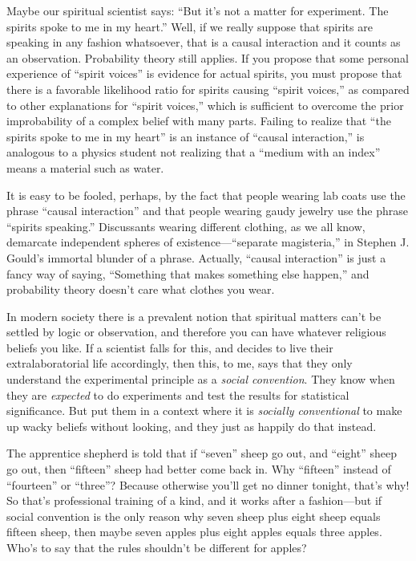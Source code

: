{
 Maybe our spiritual scientist says: ``But
it's not a matter for experiment. The spirits spoke to
me in my heart.'' Well, if we really suppose that
spirits are speaking in any fashion whatsoever, that is a causal
interaction and it counts as an observation. Probability theory still
applies. If you propose that some personal experience of
``spirit voices'' is evidence for
actual spirits, you must propose that there is a favorable likelihood
ratio for spirits causing ``spirit
voices,'' as compared to other explanations for
``spirit voices,'' which is
sufficient to overcome the prior improbability of a complex belief with
many parts. Failing to realize that ``the spirits
spoke to me in my heart'' is an instance of
``causal interaction,'' is analogous
to a physics student not realizing that a ``medium
with an index'' means a material such as water.}

{
 It is easy to be fooled, perhaps, by the fact that people wearing
lab coats use the phrase ``causal
interaction'' and that people wearing gaudy jewelry
use the phrase ``spirits speaking.''
Discussants wearing different clothing, as we all know, demarcate
independent spheres of existence---``separate
magisteria,'' in Stephen J. Gould's
immortal blunder of a phrase. Actually, ``causal
interaction'' is just a fancy way of saying,
``Something that makes something else
happen,'' and probability theory
doesn't care what clothes you wear.}

{
 In modern society there is a prevalent notion that spiritual
matters can't be settled by logic or observation, and
therefore you can have whatever religious beliefs you like. If a
scientist falls for this, and decides to live their extralaboratorial
life accordingly, then this, to me, says that they only understand the
experimental principle as a \textit{social convention}. They know when
they are \textit{expected} to do experiments and test the results for
statistical significance. But put them in a context where it is
\textit{socially conventional} to make up wacky beliefs without
looking, and they just as happily do that instead.}

{
 The apprentice shepherd is told that if
``seven'' sheep go out, and
``eight'' sheep go out, then
``fifteen'' sheep had better come
back in. Why ``fifteen'' instead of
``fourteen'' or
``three''? Because otherwise
you'll get no dinner tonight, that's
why! So that's professional training of a kind, and it
works after a fashion---but if social convention is the only reason why
seven sheep plus eight sheep equals fifteen sheep, then maybe seven
apples plus eight apples equals three apples. Who's to
say that the rules shouldn't be different for apples?}


